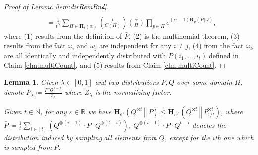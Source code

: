 \documentclass{article}
\theoremstyle{plain}
\newtheorem{lemma}[theorem]{Lemma}
\theoremstyle{definition}
\newcommand{\eps}{\varepsilon}
\newcommand{\reals}{\mathbb{R}}
\newcommand{\naturals}{\mathbb{N}}
\newcommand{\Renyi}[1]{\boldsymbol{R}_{#1}}
\newcommand{\RenyiDiv}[3]{\Renyi{#1}\left(#2 \Vert #3 \right)}
\newcommand{\HockeyStick}[1]{\boldsymbol{H}_{#1}}
\newcommand{\HockeyStickDiv}[3]{\HockeyStick{#1}\left(#2 ~\left\Vert~ #3 \right. \right)}
\begin{document}
\begin{proof} [Proof of Lemma \ref{lem:dirRemBnd}]
\begin{align*}
        \\ & = \frac{1}{t^{\alpha}} \sum_{\Pi \in \boldsymbol{\Pi}_{t}(\alpha)} \binom{t}{C(\Pi)} \binom{\alpha}{\Pi} \prod_{p \in \Pi} e^{(\alpha-1) \RenyiDiv{p}{P}{Q}},
    \end{align*}
    where (1) results from the definition of $\bar{P}$, (2) is the multinomial theorem, (3) results from the fact $\omega_{i}$ and $\omega_{j}$ are independent for any $i \ne j$, (4) from the fact $\omega_{k}$ are all identically and independently distributed with $P(i_{1}, \ldots, i_{t})$ defined in Claim \ref{clm:multiCount}, and (5) results from Claim \ref{clm:multiCount}.
\end{proof}

\begin{lemma}\label{lem:dirAddBnd}
    Given $\lambda \in [0,1]$ and two distributions $P, Q$ over some domain $\Omega$, denote $P_{\lambda} \coloneqq \frac{P^{\lambda} Q^{1-\lambda}}{Z_{\lambda}}$ where $Z_{\lambda}$ is the normalizing factor.

    Given $t \in \naturals$, for any $\eps \in \reals$ we have $\HockeyStickDiv{e^{\eps}}{Q^{\otimes t}}{\bar{P}} \le \HockeyStickDiv{e^{\eps'}}{Q^{\otimes t}}{P_{1/t}^{\otimes t}}$, where $\bar{P} \coloneqq \frac{1}{t} \sum_{i \in [t]} \left(Q^{\otimes (i-1)} \cdot P \cdot Q^{\otimes (t-i)} \right)$, $Q^{\otimes (i-1)} \cdot P \cdot Q^{t-i}$ denotes the distribution induced by sampling all elements from $Q$, except for the $i$th one which is sampled from $P$.
\end{lemma}
\end{document}
